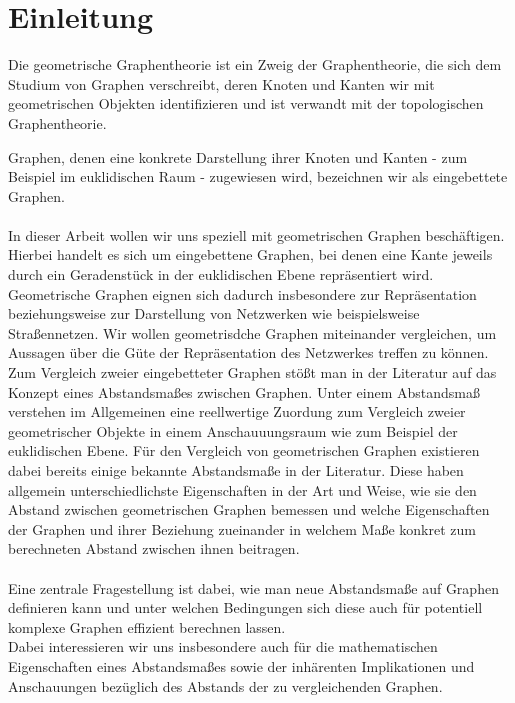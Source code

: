 \documentclass[a4paper, 12pt, twoside]{article}
\theoremstyle{Format1} %
\begin{document}
\newpage
\tableofcontents
\newpage\null\thispagestyle{empty}\newpage %
\section{Einleitung}

Die geometrische Graphentheorie ist ein Zweig der Graphentheorie, die sich dem Studium von Graphen verschreibt, deren Knoten und Kanten wir mit geometrischen Objekten identifizieren
und ist verwandt mit der topologischen Graphentheorie.

Graphen, denen eine konkrete Darstellung ihrer Knoten und Kanten - zum Beispiel im euklidischen Raum - zugewiesen wird, bezeichnen wir als eingebettete Graphen.
\\
\\
In dieser Arbeit wollen wir uns speziell mit geometrischen Graphen beschäftigen. Hierbei handelt es sich um eingebettene Graphen,
bei denen eine Kante jeweils durch ein Geradenstück in der euklidischen Ebene repräsentiert wird.
Geometrische Graphen eignen sich dadurch insbesondere zur Repräsentation beziehungsweise zur Darstellung von Netzwerken wie beispielsweise Straßennetzen.
Wir wollen geometrisdche Graphen miteinander vergleichen, um Aussagen über die Güte der Repräsentation des Netzwerkes treffen zu können.
\\
Zum Vergleich zweier eingebetteter Graphen stößt man in der Literatur auf das Konzept eines Abstandsmaßes zwischen Graphen.
Unter einem Abstandsmaß verstehen im Allgemeinen eine reellwertige Zuordung zum Vergleich zweier geometrischer Objekte in einem Anschauuungsraum wie zum Beispiel der euklidischen Ebene.
Für den Vergleich von geometrischen Graphen existieren dabei bereits einige bekannte Abstandsmaße in der Literatur.
Diese haben allgemein unterschiedlichste Eigenschaften in der Art und Weise, wie sie den Abstand zwischen geometrischen Graphen bemessen und welche Eigenschaften der Graphen und ihrer Beziehung
zueinander in welchem Maße konkret zum berechneten Abstand zwischen ihnen beitragen.
\\
\\
Eine zentrale Fragestellung ist dabei, wie man neue Abstandsmaße auf Graphen definieren kann und unter welchen Bedingungen sich diese auch für potentiell komplexe Graphen effizient berechnen lassen.
\\
Dabei interessieren wir uns insbesondere auch für die mathematischen Eigenschaften eines Abstandsmaßes sowie der inhärenten Implikationen und Anschauungen bezüglich des Abstands der zu vergleichenden Graphen.
\end{document}
